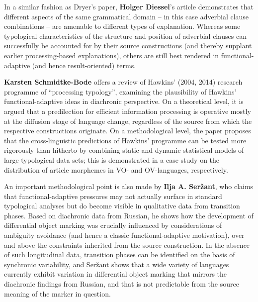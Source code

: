 \documentclass[output=paper]{langsci/langscibook}
\begin{document}
In a similar fashion as Dryer’s paper, \textbf{Holger Diessel}’s article demonstrates that different aspects of the same grammatical domain – in this case adverbial clause combinations – are amenable to different types of explanation. Whereas some typological characteristics of the structure and position of adverbial clauses can successfully be accounted for by their source constructions (and thereby supplant earlier processing-based explanations), others are still best rendered in functional-adaptive (and hence result-oriented) terms.

\textbf{Karsten Schmidtke-Bode} offers a review of Hawkins’ (2004, 2014) research programme of “processing typology”, examining the plausibility of Hawkins’ functional-adaptive ideas in diachronic perspective. On a theoretical level, it is argued that a predilection for efficient information processing is operative mostly at the diffusion stage of language change, regardless of the source from which the respective constructions originate. On a methodological level, the paper proposes that the cross-linguistic predictions of Hawkins’ programme can be tested more rigorously than hitherto by combining static and dynamic statistical models of large typological data sets; this is demonstrated in a case study on the distribution of article morphemes in VO- and OV-languages, respectively.

An important methodological point is also made by \textbf{Ilja A. Seržant}, who claims that functional-adaptive pressures may not actually surface in standard typological analyses but do become visible in qualitative data from transition phases. Based on diachronic data from Russian, he shows how the development of differential object marking was crucially influenced by considerations of ambiguity avoidance (and hence a classic functional-adaptive motivation), over and above the constraints inherited from the source construction. In the absence of such longitudinal data, transition phases can be identified on the basis of synchronic variability, and Seržant shows that a wide variety of languages currently exhibit variation in differential object marking that mirrors the diachronic findings from Russian, and that is not predictable from the source meaning of the marker in question.
\end{document}
